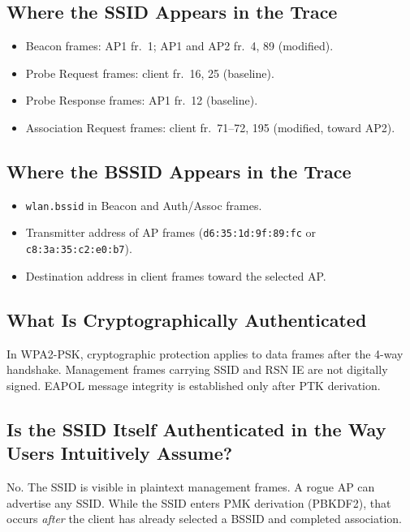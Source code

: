 \documentclass[12pt,a4paper]{article}
\begin{document}
\subsection{Where the SSID Appears in the Trace}

\begin{itemize}
    \item Beacon frames: AP1 fr.\ 1; AP1 and AP2 fr.\ 4, 89 (modified).
    \item Probe Request frames: client fr.\ 16, 25 (baseline).
    \item Probe Response frames: AP1 fr.\ 12 (baseline).
    \item Association Request frames: client fr.\ 71--72, 195 (modified, toward AP2).
\end{itemize}

\subsection{Where the BSSID Appears in the Trace}

\begin{itemize}
    \item \texttt{wlan.bssid} in Beacon and Auth/Assoc frames.
    \item Transmitter address of AP frames (\texttt{d6:35:1d:9f:89:fc} or \texttt{c8:3a:35:c2:e0:b7}).
    \item Destination address in client frames toward the selected AP.
\end{itemize}

\subsection{What Is Cryptographically Authenticated}

In WPA2-PSK, cryptographic protection applies to data frames after the 4-way handshake. Management frames carrying SSID and RSN IE are not digitally signed. EAPOL message integrity is established only after PTK derivation.

\subsection{Is the SSID Itself Authenticated in the Way Users Intuitively Assume?}

No. The SSID is visible in plaintext management frames. A rogue AP can advertise any SSID. While the SSID enters PMK derivation (PBKDF2), that occurs \emph{after} the client has already selected a BSSID and completed association.
\end{document}
